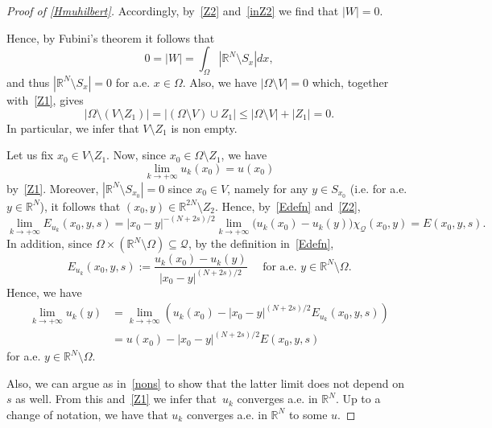 \documentclass[12pt,a4paper,intlimits,sumlimits]{amsart}
\def \R {\mathbb{R}}
\def \Q {\mathcal Q}
\theoremstyle{definition}
\theoremstyle{plain}
\numberwithin{equation}{section}
\renewcommand{\le}{\leqslant}
\begin{document}
\begin{appendix}
\begin{proof}[Proof of \eqref{Hmuhilbert}]
Accordingly, by~\eqref{Z2} and~\eqref{inZ2} we find that $|W|=0$. 

Hence, by Fubini's theorem it follows that
\[
0=|W|=\int_\Omega \left|\R^N\setminus S_x\right| dx,
\]
and thus $|\R^N\setminus S_x|=0$ for a.e. $x\in\Omega$. Also, we have $|\Omega\setminus V|=0$ which, together with~\eqref{Z1}, gives
\[
|\Omega\setminus (V\setminus Z_1)| = |(\Omega\setminus V)\cup Z_1| \le |\Omega\setminus V| +|Z_1| =0.
\]
In particular, we infer that $V\setminus Z_1$ is non empty. 

Let us fix $x_0\in V\setminus Z_1$. Now, since $x_0\in\Omega\setminus Z_1$, we have
\[
\lim_{k\to +\infty} u_k(x_0) = u(x_0)
\]
by~\eqref{Z1}. Moreover, $|\R^N\setminus S_{x_0}|=0$ since $x_0\in V$, namely for any $y\in S_{x_0}$ (i.e. for a.e. $y\in\R^N$), it follows that $(x_0, y)\in \R^{2N}\setminus Z_2$. Hence,  by~\eqref{Edefn} and~\eqref{Z2},
\begin{equation}\label{nons}
\lim_{k\to +\infty} E_{u_k}(x_0, y, s) = |x_0 -y|^{-(N+2s)/2} \lim_{k\to +\infty} \big( u_k(x_0) -u_k(y)\big) \chi_{\Q} (x_0, y) =  E(x_0, y, s).
\end{equation}
In addition, since $\Omega\times(\R^N\setminus\Omega)\subseteq \Q$, by the definition in~\eqref{Edefn},
\[
E_{u_k}(x_0, y, s):=\frac{u_k(x_0) -u_k(y)}{|x_0-y|^{(N+2s)/2}}\quad\mbox{ for a.e. } y\in\R^N\setminus \Omega.
\]
Hence, we have
\begin{align*}
\lim_{k\to +\infty} u_k(y) &= \lim_{k\to +\infty}\left(u_k(x_0) -|x_0-y|^{(N+2s)/2} E_{u_k}(x_0, y, s) \right)\\
&= u(x_0) -|x_0-y|^{(N+2s)/2} E(x_0, y, s)
\end{align*}
for a.e. $y\in\R^N\setminus\Omega$. 

Also, we can argue as in~\eqref{nons} to show that the latter limit does not depend on~$s$ as well. {F}rom this and~\eqref{Z1} we infer that~$u_k$ converges a.e. in $\R^N$. Up to a change of notation, we have that $u_k$ converges a.e. in $\R^N$ to some $u$. 


\end{proof}
\end{appendix}
\end{document}
